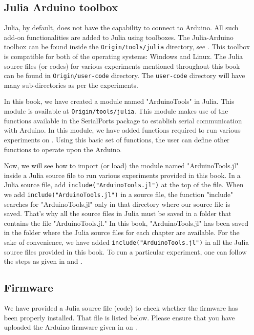 \subsection{Julia Arduino toolbox}
\label{sec:julia-toolbox}
Julia, by default, does not have the capability to connect to Arduino. 
All such add-on functionalities are added to Julia using toolboxes. 
The Julia-Arduino toolbox can be found inside the {\tt Origin/tools/julia} directory, 
see .  This toolbox is compatible for both of the operating systems: Windows and Linux. 
The Julia source files (or codes) for various experiments mentioned throughout this book can be found in 
{\tt Origin/user-code} directory. The {\tt user-code} directory will have many sub-directories as per the experiments. 

In this book, we have created a module named "ArduinoTools" in Julia.  This module is available at 
{\tt Origin/tools/julia}. This module makes use of the functions available in the SerialPorts package to 
establish serial communication with Arduino. In this module, we have added functions required to run 
various experiments on \arduino. Using this basic set of functions, the user can define other functions to operate
upon the Arduino. 


Now, we will see how to import (or load) the module named "ArduinoTools.jl" inside a Julia source file to run 
various experiments provided in this book. In a Julia source file, add {\tt include("ArduinoTools.jl")} at the top of the file. 
When we add {\tt include("ArduinoTools.jl")} in a source file, the function "include" searches for "ArduinoTools.jl" 
only in that directory where our source file is saved. That's why all the source files in Julia 
must be saved in a folder that contains the file "ArduinoTools.jl." In this book, "ArduinoTools.jl" has been saved 
in the folder where the Julia source files for each chapter are available. For the sake of convenience, we have 
added {\tt include("ArduinoTools.jl")} in all the Julia source files provided in this book. 
To run a particular experiment, one can follow the steps as given in  and . 

\subsection{Firmware}
\lstset{style=mystyle}
\label{sec:test-firmware-julia}
We have provided a Julia source file (code) to check whether the firmware has been
properly installed.  That file is listed below.  Please ensure that 
you have uploaded the Arduino firmware given in  on \arduino.

